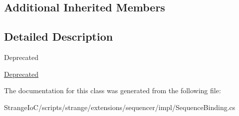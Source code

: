 \subsection*{Additional Inherited Members}


\subsection{Detailed Description}
\begin{DoxyRefDesc}{Deprecated}
\item[\hyperlink{deprecated__deprecated000006}{Deprecated}]\end{DoxyRefDesc}


The documentation for this class was generated from the following file\-:\begin{DoxyCompactItemize}
\item 
Strange\-Io\-C/scripts/strange/extensions/sequencer/impl/Sequence\-Binding.\-cs\end{DoxyCompactItemize}
